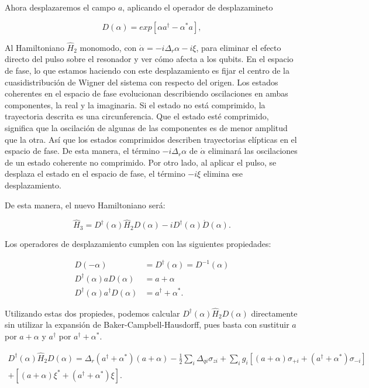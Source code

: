 Ahora desplazaremos el campo $a$, aplicando el operador de desplazamineto

\begin{equation}
    D(\alpha) = exp[\alpha a^\dagger - \alpha^* a] ,
\end{equation}

Al Hamiltoniano $\hat{H}_2$ monomodo, con $\dot{\alpha} = -i \Delta_r \alpha -i \xi$, para eliminar el efecto directo del pulso sobre el resonador y ver cómo afecta a los qubits. En el espacio de fase, lo que estamos haciendo con este desplazamiento es fijar el centro de la cuasidistribución de Wigner del sistema con respecto del origen. Los estados coherentes en el espacio de fase evolucionan describiendo oscilaciones en ambas componentes, la real y la imaginaria. Si el estado no está comprimido, la trayectoria descrita es una circunferencia. Que el estado esté comprimido, significa que la oscilación de algunas de las componentes es de menor amplitud que la otra. Así que los estados comprimidos describen trayectorias elípticas en el espacio de fase. De esta manera, el término $-i \Delta_r \alpha$ de $\dot{\alpha}$ eliminará las oscilaciones de un estado coherente no comprimido. Por otro lado, al aplicar el pulso, se desplaza el estado en el espacio de fase, el término $-i \xi$ elimina ese desplazamiento.

De esta manera, el nuevo Hamiltoniano será:

\begin{equation}
    \hat{H}_3 = D^\dagger (\alpha) \hat{H}_2 D(\alpha) -i D^\dagger(\alpha) \dot{D}(\alpha) .
\end{equation}

Los operadores de desplazamiento cumplen con las siguientes propiedades:

\begin{align}
    D(-\alpha) &= D^\dagger(\alpha) = D^{-1}(\alpha) \\
    D^\dagger(\alpha) a D(\alpha) &= a + \alpha \\
    D^\dagger(\alpha) a^\dagger D(\alpha) &= a^\dagger + \alpha^* .
\end{align}

Utilizando estas dos propiedes, podemos calcular $D^\dagger(\alpha) \hat{H}_2 D(\alpha)$ directamente sin utilizar la expansión de Baker-Campbell-Hausdorff, pues basta con sustituir $a$ por $a+\alpha$ y $a^\dagger$ por $a^\dagger+\alpha^*$.

\begin{multline}
  D^\dagger(\alpha) \hat{H}_2 D(\alpha) = \Delta_r (a^\dagger + \alpha^*) (a + \alpha) - \frac{1}{2} \sum\limits_i \Delta_{qi} \sigma_{zi} + \sum\limits_i g_i [(a+\alpha) \sigma_{+ i} + (a^\dagger+\alpha^*) \sigma_{- i}] \\
  + [(a+\alpha)\xi^*+(a^\dagger+\alpha^*)\xi] .
\end{multline}

